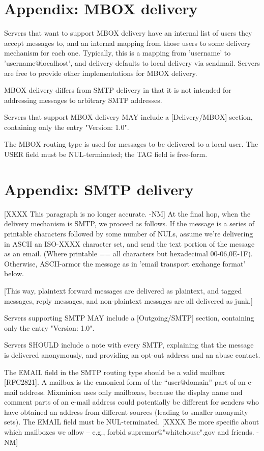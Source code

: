 \section{Appendix: MBOX delivery}

Servers that want to support MBOX delivery have an internal list of
users they accept messages to, and an internal mapping from those
users to some delivery mechanism for each one.  Typically, this is a
mapping from 'username' to 'username@localhost', and delivery defaults
to local delivery via sendmail.  Servers are free to provide other
implementations for MBOX delivery.

MBOX delivery differs from SMTP delivery in that it is not intended
for addressing messages to arbitrary SMTP addresses.

Servers that support MBOX delivery MAY include a [Delivery/MBOX]
section, containing only the entry "Version: 1.0".

The MBOX routing type is used for messages to be delivered to a local
user.  The USER field must be NUL-terminated; the TAG field is
free-form. 

\section{Appendix: SMTP delivery}

[XXXX This paragraph is no longer accurate. -NM]
At the final hop, when the delivery mechanism is SMTP, we proceed as
follows.  If the message is a series of printable characters followed
by some number of NULs, assume we're delivering in ASCII an ISO-XXXX
character set, and send the text portion of the message as an email.
(Where printable == {all characters but hexadecimal 00-06,0E-1F}).
Otherwise, ASCII-armor the message as in 'email transport exchange
format' below.

[This way, plaintext forward messages are delivered as plaintext,
and tagged messages, reply messages, and non-plaintext messages are
all delivered as junk.]

Servers supporting SMTP MAY include a [Outgoing/SMTP] section,
containing only the entry "Version: 1.0".

Servers SHOULD include a note with every SMTP, explaining that the
message is delivered anonymously, and providing an opt-out address and
an abuse contact.

The EMAIL field in the SMTP routing type should be a valid mailbox
[RFC2821]. A mailbox is the canonical form of the ``user@domain''
part of an e-mail address. Mixminion uses only mailboxes, because the
display name and comment parts of an e-mail address could potentially be
different for senders who have obtained an address from different
sources (leading to smaller anonymity sets). The EMAIL field must be
NUL-terminated.
[XXXX Be more specific about which mailboxes we allow -- e.g., forbid
  supremor@"whitehouse".gov and friends. -NM]

